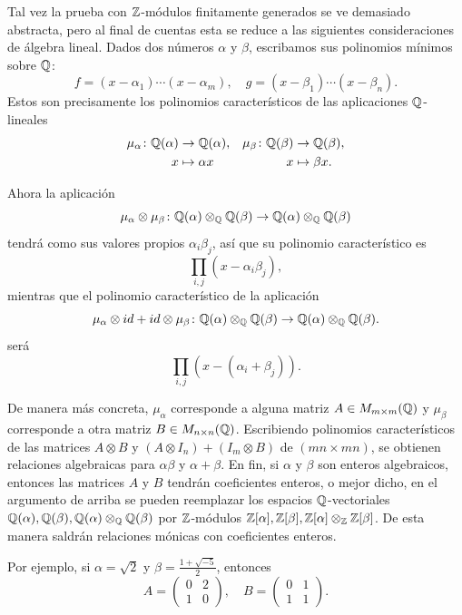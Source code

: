 \begin{comentario}
  Tal vez la prueba con $\mathbb{Z}$-módulos finitamente generados se ve demasiado
  abstracta, pero al final de cuentas esta se reduce a las siguientes
  consideraciones de álgebra lineal. Dados dos números $\alpha$ y $\beta$,
  escribamos sus polinomios mínimos sobre $\mathbb{Q}$:
  \[ f = (x - \alpha_1)\cdots (x - \alpha_m), \quad
     g = (x - \beta_1)\cdots (x - \beta_n). \]
  Estos son precisamente los polinomios característicos de las aplicaciones
  $\mathbb{Q}$-lineales
  \begin{align*}
    \mu_\alpha\colon \mathbb{Q} (\alpha) & \to \mathbb{Q} (\alpha), & \mu_\beta\colon \mathbb{Q} (\beta) & \to \mathbb{Q} (\beta),\\
    x & \mapsto \alpha x & x & \mapsto \beta x.
  \end{align*}

  Ahora la aplicación
  \[ \mu_\alpha\otimes\mu_\beta\colon
     \mathbb{Q}(\alpha)\otimes_{\mathbb{Q}} \mathbb{Q}(\beta) \to \mathbb{Q}(\alpha)\otimes_{\mathbb{Q}} \mathbb{Q}(\beta) \]
  tendrá como sus valores propios $\alpha_i\beta_j$, así que su polinomio
  característico es
  $$\prod_{i,j} (x - \alpha_i \beta_j),$$
  mientras que el polinomio característico de la aplicación
  \[ \mu_\alpha\otimes id + id \otimes \mu_\beta\colon
     \mathbb{Q}(\alpha)\otimes_{\mathbb{Q}} \mathbb{Q}(\beta) \to \mathbb{Q}(\alpha)\otimes_{\mathbb{Q}} \mathbb{Q}(\beta). \]
  será
  $$\prod_{i,j} (x - (\alpha_i + \beta_j)).$$

  De manera más concreta, $\mu_\alpha$ corresponde a alguna matriz
  $A \in M_{m\times m} (\mathbb{Q})$ y $\mu_\beta$ corresponde a otra matriz
  $B \in M_{n\times n} (\mathbb{Q})$. Escribiendo polinomios característicos de las
  matrices $A \otimes B$ y $(A \otimes I_n) + (I_m\otimes B)$
  de $(mn\times mn)$, se obtienen relaciones algebraicas para
  $\alpha\beta$ y $\alpha + \beta$.
  En fin, si $\alpha$ y $\beta$ son enteros algebraicos, entonces las matrices
  $A$ y $B$ tendrán coeficientes enteros, o mejor dicho, en el argumento
  de arriba se pueden reemplazar los espacios $\mathbb{Q}$-vectoriales
  $\mathbb{Q} (\alpha), \mathbb{Q} (\beta), \mathbb{Q} (\alpha)\otimes_{\mathbb{Q}} \mathbb{Q} (\beta)$ por
  $\mathbb{Z}$-módulos
  $\mathbb{Z} [\alpha], \mathbb{Z} [\beta], \mathbb{Z} [\alpha]\otimes_{\mathbb{Z}} \mathbb{Z} [\beta]$.
  De esta manera saldrán relaciones mónicas con coeficientes enteros.

  Por ejemplo, si $\alpha = \sqrt{2}$ y $\beta = \frac{1 + \sqrt{-5}}{2}$,
  entonces
  \[ A = \begin{pmatrix}
    0 & 2 \\
    1 & 0
  \end{pmatrix}, \quad B = \begin{pmatrix}
    0 & 1 \\
    1 & 1
  \end{pmatrix}. \]


\end{comentario}
